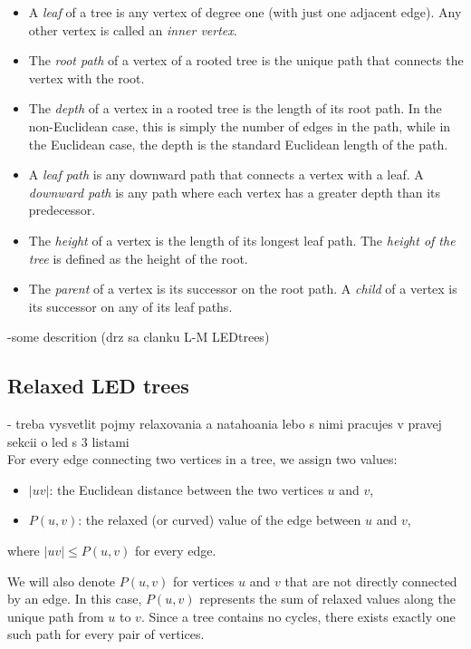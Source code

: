 \documentclass[12pt]{article}
\newcommand{\Price}[2]{P(#1,#2)}
\begin{document}
		\begin{itemize}
			\item A \emph{leaf} of a tree is any vertex of degree one (with just one adjacent edge). Any other vertex is called an \emph{inner vertex}.
			\item The \emph{root path} of a vertex of a rooted tree is the unique path that connects the vertex with the root.
			\item The \emph{depth} of a vertex in a rooted tree is the length of its root path. In the non-Euclidean case, this is simply the number of edges in the path, while in the Euclidean case, the depth is the standard Euclidean length of the path.
			\item A \emph{leaf path} is any downward path that connects a vertex with a leaf. A \emph{downward path} is any path where each vertex has a greater depth than its predecessor.
			\item The \emph{height} of a vertex is the length of its longest leaf path. The \emph{height of the tree} is defined as the height of the root.
			\item The \emph{parent} of a vertex is its successor on the root path. A \emph{child} of a vertex is its successor on any of its leaf paths.
		\end{itemize}
		
		
		-some descrition (drz sa clanku L-M LEDtrees)
		
	\subsection{Relaxed LED trees}	
	
		- treba vysvetlit pojmy relaxovania a natahoania lebo s nimi pracujes v pravej sekcii o led s 3 listami
			\\
		
				
		For every edge connecting two vertices in a tree, we assign two values:
		\begin{itemize}
			\item \( |uv| \): the Euclidean distance between the two vertices \( u \) and \( v \),
			\item \( \Price{u}{v} \): the relaxed (or curved) value of the edge between \( u \) and \( v \),
		\end{itemize}
		where \( |uv| \leq \Price{u}{v} \) for every edge.
		
		We will also denote \( \Price{u}{v} \) for vertices \( u \) and \( v \) that are not directly connected by an edge. In this case, \( \Price{u}{v} \) represents the sum of relaxed values along the unique path from \( u \) to \( v \). Since a tree contains no cycles, there exists exactly one such path for every pair of vertices.
		
\end{document}
